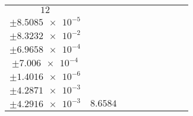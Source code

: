 \documentclass[8pt]{article}
\begin{document}
\begin{longtable}[l]{c c c c c c c c c}
$\num{12}$ & \begin{tabular}[c]{@{}c@{}}$\num{5.9849e-2}$ \\ $\pm\num{8.5085e-5}$\end{tabular} & \begin{tabular}[c]{@{}c@{}}$\num{-0.37117}$ \\ $\pm\num{8.3232e-2}$\end{tabular} & \begin{tabular}[c]{@{}c@{}}$\num{3.3293}$ \\ $\pm\num{6.9658e-4}$\end{tabular} & \begin{tabular}[c]{@{}c@{}}$\num{1.9842e+3}$ \\ $\pm\num{7.006e-4}$\end{tabular} & \begin{tabular}[c]{@{}c@{}}$\num{3.9696}$ \\ $\pm\num{1.4016e-6}$\end{tabular} & \begin{tabular}[c]{@{}c@{}}$\num{2.6276}$ \\ $\pm\num{4.2871e-3}$\end{tabular} & \begin{tabular}[c]{@{}c@{}}$\num{2.6197}$ \\ $\pm\num{4.2916e-3}$\end{tabular} & $\num{8.6584}$\\
\bottomrule
\end{longtable}
\end{document}
